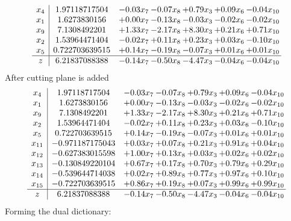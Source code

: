 \documentclass[8pt]{article}
\begin{document}
\[\begin{array}{c| c c@{\hskip 2pt} c@{\hskip 2pt} c@{\hskip 2pt} c@{\hskip 2pt} c@{\hskip 2pt} }
 x_{4}   &  1.97118717504 & -0.03 x_{7} & -0.07 x_{8} & +  0.79 x_{3} & +  0.09 x_{6} & -0.04 x_{10}\\
 x_{1}   &  1.6273830156 & +  0.00 x_{7} & -0.13 x_{8} & -0.03 x_{3} & -0.02 x_{6} & -0.02 x_{10}\\
 x_{9}   &  7.1308492201 & +  1.33 x_{7} & -2.17 x_{8} & +  8.30 x_{3} & +  0.21 x_{6} & +  0.71 x_{10}\\
 x_{2}   &  1.53964471404 & -0.02 x_{7} & +  0.11 x_{8} & +  0.23 x_{3} & +  0.03 x_{6} & -0.10 x_{10}\\
 x_{5}   &  0.722703639515 & +  0.14 x_{7} & -0.19 x_{8} & -0.07 x_{3} & +  0.01 x_{6} & +  0.01 x_{10}\\
\hline
z    &  6.21837088388 & -0.14 x_{7} & -0.50 x_{8} & -4.47 x_{3} & -0.04 x_{6} & -0.04 x_{10}\\
\end{array}\]
 After cutting plane is added 
\[\begin{array}{c| c c@{\hskip 2pt} c@{\hskip 2pt} c@{\hskip 2pt} c@{\hskip 2pt} c@{\hskip 2pt} }
 x_{4}   &  1.97118717504 & -0.03 x_{7} & -0.07 x_{8} & +  0.79 x_{3} & +  0.09 x_{6} & -0.04 x_{10}\\
 x_{1}   &  1.6273830156 & +  0.00 x_{7} & -0.13 x_{8} & -0.03 x_{3} & -0.02 x_{6} & -0.02 x_{10}\\
 x_{9}   &  7.1308492201 & +  1.33 x_{7} & -2.17 x_{8} & +  8.30 x_{3} & +  0.21 x_{6} & +  0.71 x_{10}\\
 x_{2}   &  1.53964471404 & -0.02 x_{7} & +  0.11 x_{8} & +  0.23 x_{3} & +  0.03 x_{6} & -0.10 x_{10}\\
 x_{5}   &  0.722703639515 & +  0.14 x_{7} & -0.19 x_{8} & -0.07 x_{3} & +  0.01 x_{6} & +  0.01 x_{10}\\
 x_{11}   &  -0.971187175043 & +  0.03 x_{7} & +  0.07 x_{8} & +  0.21 x_{3} & +  0.91 x_{6} & +  0.04 x_{10}\\
 x_{12}   &  -0.627383015598 & +  1.00 x_{7} & +  0.13 x_{8} & +  0.03 x_{3} & +  0.02 x_{6} & +  0.02 x_{10}\\
 x_{13}   &  -0.130849220104 & +  0.67 x_{7} & +  0.17 x_{8} & +  0.70 x_{3} & +  0.79 x_{6} & +  0.29 x_{10}\\
 x_{14}   &  -0.539644714038 & +  0.02 x_{7} & +  0.89 x_{8} & +  0.77 x_{3} & +  0.97 x_{6} & +  0.10 x_{10}\\
 x_{15}   &  -0.722703639515 & +  0.86 x_{7} & +  0.19 x_{8} & +  0.07 x_{3} & +  0.99 x_{6} & +  0.99 x_{10}\\
\hline
z    &  6.21837088388 & -0.14 x_{7} & -0.50 x_{8} & -4.47 x_{3} & -0.04 x_{6} & -0.04 x_{10}\\
\end{array}\]
Forming the dual dictionary:
\end{document}

